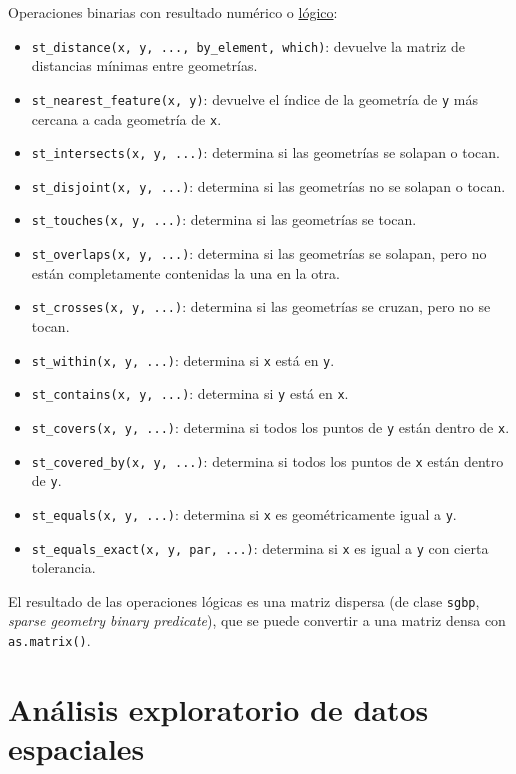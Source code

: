 \documentclass[
  spanish,
]{book}
\providecommand{\tightlist}{%
  \setlength{\itemsep}{0pt}\setlength{\parskip}{0pt}}
\theoremstyle{break}
\begin{document}
Operaciones binarias con resultado numérico o \href{https://r-spatial.github.io/sf/reference/geos_binary_pred.html}{lógico}:

\begin{itemize}
\tightlist
\item
  \texttt{st\_distance(x,\ y,\ ...,\ by\_element,\ which)}: devuelve la matriz de distancias mínimas entre geometrías.
\item
  \texttt{st\_nearest\_feature(x,\ y)}: devuelve el índice de la geometría de \texttt{y} más cercana a cada geometría de \texttt{x}.
\item
  \texttt{st\_intersects(x,\ y,\ ...)}: determina si las geometrías se solapan o tocan.
\item
  \texttt{st\_disjoint(x,\ y,\ ...)}: determina si las geometrías no se solapan o tocan.
\item
  \texttt{st\_touches(x,\ y,\ ...)}: determina si las geometrías se tocan.
\item
  \texttt{st\_overlaps(x,\ y,\ ...)}: determina si las geometrías se solapan, pero no están completamente contenidas la una en la otra.
\item
  \texttt{st\_crosses(x,\ y,\ ...)}: determina si las geometrías se cruzan, pero no se tocan.
\item
  \texttt{st\_within(x,\ y,\ ...)}: determina si \texttt{x} está en \texttt{y}.
\item
  \texttt{st\_contains(x,\ y,\ ...)}: determina si \texttt{y} está en \texttt{x}.
\item
  \texttt{st\_covers(x,\ y,\ ...)}: determina si todos los puntos de \texttt{y} están dentro de \texttt{x}.
\item
  \texttt{st\_covered\_by(x,\ y,\ ...)}: determina si todos los puntos de \texttt{x} están dentro de \texttt{y}.
\item
  \texttt{st\_equals(x,\ y,\ ...)}: determina si \texttt{x} es geométricamente igual a \texttt{y}.
\item
  \texttt{st\_equals\_exact(x,\ y,\ par,\ ...)}: determina si \texttt{x} es igual a \texttt{y} con cierta tolerancia.
\end{itemize}

El resultado de las operaciones lógicas es una matriz dispersa (de clase \texttt{sgbp}, \emph{sparse geometry binary predicate}), que se puede convertir a una matriz densa con \texttt{as.matrix()}.

\hypertarget{sp-eda}{%
\section{Análisis exploratorio de datos espaciales}\label{sp-eda}}
\end{document}
